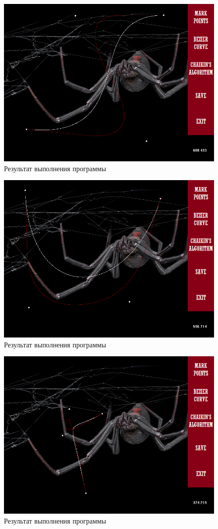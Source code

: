 \documentclass[14pt, a4paper]{extreport}
\begin{document}
\begin{figure}[h!]
	\centering
	\includegraphics[width = 13cm]{image/image_1}
  \caption{Результат выполнения программы}
\end{figure}
\begin{figure}[h!]
	\centering
	\includegraphics[width = 13cm]{image/image_2}
  \caption{Результат выполнения программы}
\end{figure}
\begin{figure}[h!]
	\centering
	\includegraphics[width = 13cm]{image/image_3}
  \caption{Результат выполнения программы}
\end{figure}
\end{document}
